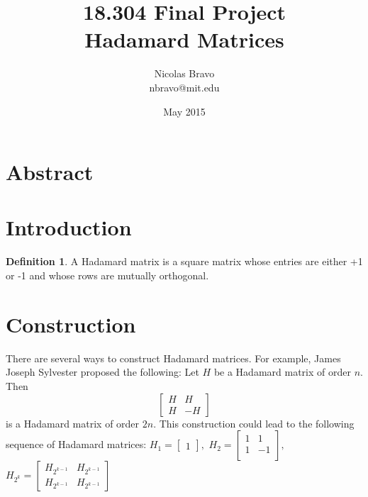 \documentclass{article}
\title{18.304 Final Project \\  Hadamard Matrices}
\author{Nicolas Bravo \\ nbravo@mit.edu }
\date{May 2015}
\theoremstyle{definition}
\newtheorem{definition}{Definition}[section]
\begin{document}
\maketitle

\section{Abstract}

\section{Introduction}

\begin{definition}
 A Hadamard matrix is a square matrix whose entries are either +1 or -1 and whose rows are mutually orthogonal.
\end{definition}

\section{Construction}
There are several ways to construct Hadamard matrices. For example, James Joseph Sylvester proposed the following: Let $H$ be a Hadamard matrix of order $n$. Then
\begin{equation*}
\begin{bmatrix}
H & H \\
H & -H
\end{bmatrix}
\end{equation*}
is a Hadamard matrix of order $2n$. This construction could lead to the following sequence of Hadamard matrices:
$H_1 =
\begin{bmatrix}
1
\end{bmatrix},
$
$H_2 =
\begin{bmatrix}
1 & 1 \\
1 & -1 \\
\end{bmatrix},
$
$H_{2^k} =
\begin{bmatrix}
H_{2^{k-1}} & H_{2^{k-1}} \\
H_{2^{k-1}} & H_{2^{k-1}}
\end{bmatrix}
$
\end{document}
